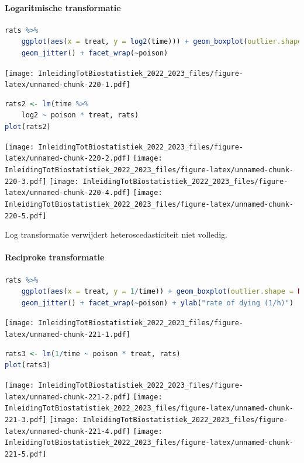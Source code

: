 \documentclass[
  12pt,dutch,coursenotes]{book}
\begin{document}
\hypertarget{logaritmische-transformatie}{%
\paragraph{Logaritmische transformatie}\label{logaritmische-transformatie}}

\begin{lstlisting}[language=R]
rats %>%
    ggplot(aes(x = treat, y = log2(time))) + geom_boxplot(outlier.shape = NA) +
    geom_jitter() + facet_wrap(~poison)
\end{lstlisting}

\texttt{[image: InleidingTotBiostatistiek\_2022\_2023\_files/figure-latex/unnamed-chunk-220-1.pdf]}

\begin{lstlisting}[language=R]
rats2 <- lm(time %>%
    log2 ~ poison * treat, rats)
plot(rats2)
\end{lstlisting}

\texttt{[image: InleidingTotBiostatistiek\_2022\_2023\_files/figure-latex/unnamed-chunk-220-2.pdf]} \texttt{[image: InleidingTotBiostatistiek\_2022\_2023\_files/figure-latex/unnamed-chunk-220-3.pdf]} \texttt{[image: InleidingTotBiostatistiek\_2022\_2023\_files/figure-latex/unnamed-chunk-220-4.pdf]} \texttt{[image: InleidingTotBiostatistiek\_2022\_2023\_files/figure-latex/unnamed-chunk-220-5.pdf]}

Log transformatie verwijdert heteroscedasticiteit niet volledig.

\hypertarget{reciproke-transformatie}{%
\paragraph{Reciproke transformatie}\label{reciproke-transformatie}}

\begin{lstlisting}[language=R]
rats %>%
    ggplot(aes(x = treat, y = 1/time)) + geom_boxplot(outlier.shape = NA) +
    geom_jitter() + facet_wrap(~poison) + ylab("rate of dying (1/h)")
\end{lstlisting}

\texttt{[image: InleidingTotBiostatistiek\_2022\_2023\_files/figure-latex/unnamed-chunk-221-1.pdf]}

\begin{lstlisting}[language=R]
rats3 <- lm(1/time ~ poison * treat, rats)
plot(rats3)
\end{lstlisting}

\texttt{[image: InleidingTotBiostatistiek\_2022\_2023\_files/figure-latex/unnamed-chunk-221-2.pdf]} \texttt{[image: InleidingTotBiostatistiek\_2022\_2023\_files/figure-latex/unnamed-chunk-221-3.pdf]} \texttt{[image: InleidingTotBiostatistiek\_2022\_2023\_files/figure-latex/unnamed-chunk-221-4.pdf]} \texttt{[image: InleidingTotBiostatistiek\_2022\_2023\_files/figure-latex/unnamed-chunk-221-5.pdf]}
\end{document}
